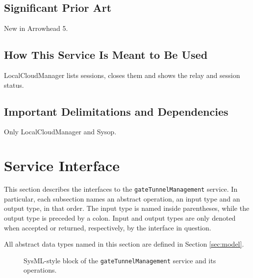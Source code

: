 \documentclass[a4paper]{arrowhead}
\begin{document}
\subsection{Significant Prior Art}

New in Arrowhead 5.

\subsection{How This Service Is Meant to Be Used}

LocalCloudManager lists sessions, closes them and shows the relay and session status.

\subsection{Important Delimitations and Dependencies}
\label{sec:delimitations}

Only LocalCloudManager and Sysop.

\newpage

\section{Service Interface}
\label{sec:operations}

This section describes the interfaces to the \texttt{gate\allowbreak{}Tunnel\allowbreak{}Management} service.
In particular, each subsection names an abstract operation, an input type and an output type, in that order.
The input type is named inside parentheses, while the output type is preceded by a colon.
Input and output types are only denoted when accepted or returned, respectively, by the interface in question.

All abstract data types named in this section are defined in Section \ref{sec:model}.

\begin{figure}[ht!]
  \centering
  \caption{SysML-style block of the \texttt{gate\allowbreak{}Tunnel\allowbreak{}Management} service and its operations.}
  \label{fig:SD}
\end{figure}
\end{document}
